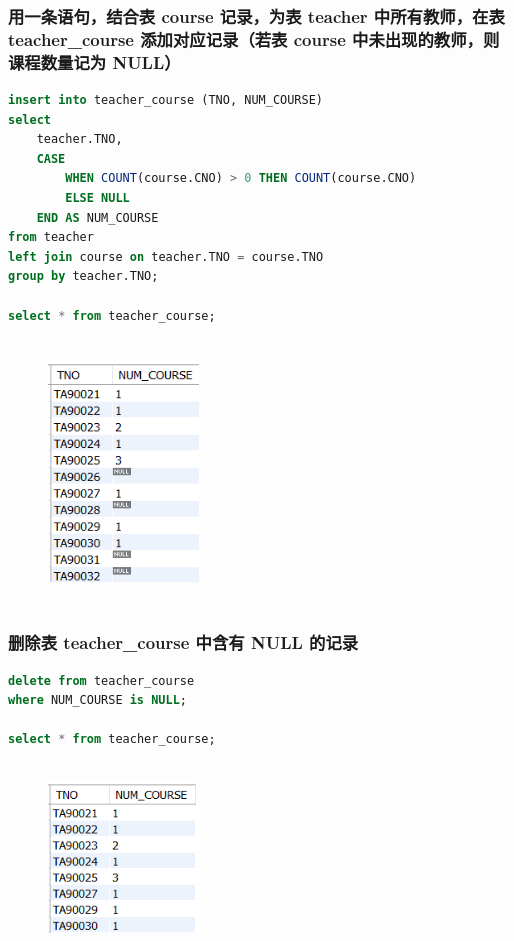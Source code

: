 \documentclass{ctexart}
\begin{document}
\subsubsection{用一条语句，结合表 course 记录，为表 teacher 中所有教师，在表 teacher\_course 添加对应记录（若表 course 中未出现的教师，则课程数量记为 NULL）}
\begin{lstlisting}[language=sql]
	insert into teacher_course (TNO, NUM_COURSE)  
select   
    teacher.TNO,   
    CASE   
        WHEN COUNT(course.CNO) > 0 THEN COUNT(course.CNO)  
        ELSE NULL   
    END AS NUM_COURSE  
from teacher  
left join course on teacher.TNO = course.TNO  
group by teacher.TNO;
 
select * from teacher_course; 
\end{lstlisting}
\begin{figure}[H]
	\centering 
	\includegraphics[height=7cm,width=4cm]{11.png}
	\end{figure}
\subsubsection{删除表 teacher\_course 中含有 NULL 的记录}
\begin{lstlisting}[language=sql]
delete from teacher_course  
where NUM_COURSE is NULL;  
  
select * from teacher_course; 
\end{lstlisting}
\begin{figure}[H]
	\centering 
	\includegraphics[height=5cm,width=4cm]{12.png}
	\end{figure}
\end{document}
